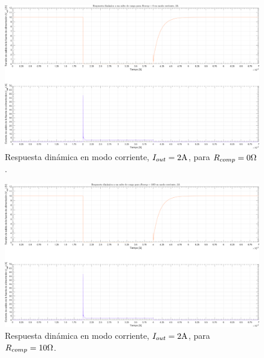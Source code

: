 \clearpage

\begin{figure}[H] %
\begin{center}
\includegraphics[width=1.1 \textwidth, angle=90]{./img/plots/dynamic/power_supply_RCOMP_0_STEP_Modo3.png}
\caption{\label{fig:fig_power_supply_RCOMP_STEP_0_Modo3}\footnotesize{Respuesta dinámica en modo corriente, $I_{out} = 2 \si[per-mode=symbol]{\ampere}$, para $R_{comp} = 0 \si[per-mode=symbol]{\ohm} $.}}
\end{center}
\end{figure}

\clearpage

\begin{figure}[H] %
\begin{center}
\includegraphics[width=1.1 \textwidth, angle=90]{./img/plots/dynamic/power_supply_RCOMP_10_STEP_Modo3.png}
\caption{\label{fig:fig_power_supply_RCOMP_STEP_10_Modo3}\footnotesize{Respuesta dinámica en modo corriente, $I_{out} = 2 \si[per-mode=symbol]{\ampere}$, para $R_{comp} = 10 \si[per-mode=symbol]{\ohm} $.}}
\end{center}
\end{figure}

